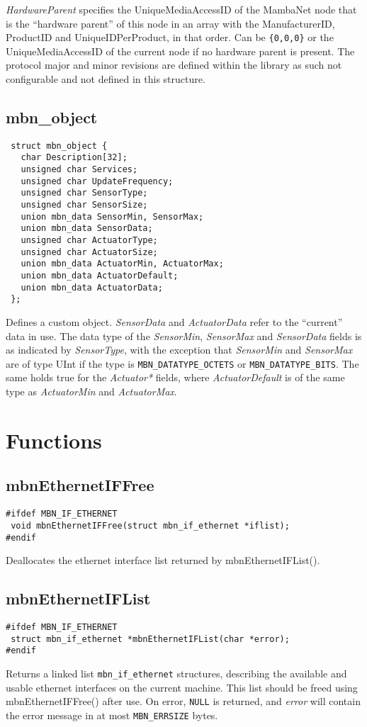 \textit{HardwareParent} specifies the UniqueMediaAccessID of the MambaNet node that is the ``hardware parent'' of this node in an array with the ManufacturerID, ProductID and UniqueIDPerProduct, in that order. Can be \verb|{0,0,0}| or the UniqueMediaAccessID of the current node if no hardware parent is present.
The protocol major and minor revisions are defined within the library as such not configurable and not defined in this structure.


\subsection{mbn\_object}
\begin{verbatim}
 struct mbn_object {
   char Description[32];
   unsigned char Services;
   unsigned char UpdateFrequency;
   unsigned char SensorType;
   unsigned char SensorSize;
   union mbn_data SensorMin, SensorMax;
   union mbn_data SensorData;
   unsigned char ActuatorType;
   unsigned char ActuatorSize;
   union mbn_data ActuatorMin, ActuatorMax;
   union mbn_data ActuatorDefault;
   union mbn_data ActuatorData;
 };
\end{verbatim}
Defines a custom object. \textit{SensorData} and \textit{ActuatorData} refer to the ``current'' data in use. The data type of the \textit{SensorMin}, \textit{SensorMax} and \textit{SensorData} fields is as indicated by \textit{SensorType}, with the exception that \textit{SensorMin} and \textit{SensorMax} are of type UInt if the type is \verb|MBN_DATATYPE_OCTETS| or \verb|MBN_DATATYPE_BITS|. The same holds true for the \textit{Actuator*} fields, where \textit{ActuatorDefault} is of the same type as \textit{ActuatorMin} and \textit{ActuatorMax}.




\cleardoublepage
\section{Functions}
\subsection{mbnEthernetIFFree}
\begin{verbatim}
#ifdef MBN_IF_ETHERNET
 void mbnEthernetIFFree(struct mbn_if_ethernet *iflist);
#endif
\end{verbatim}
Deallocates the ethernet interface list returned by mbnEthernetIFList().


\subsection{mbnEthernetIFList}
\begin{verbatim}
#ifdef MBN_IF_ETHERNET
 struct mbn_if_ethernet *mbnEthernetIFList(char *error);
#endif
\end{verbatim}
Returns a linked list \verb|mbn_if_ethernet| structures, describing the available and usable ethernet interfaces on the current machine. This list should be freed using mbnEthernetIFFree() after use. On error, \verb|NULL| is returned, and \textit{error} will contain the error message in at most \verb|MBN_ERRSIZE| bytes.

